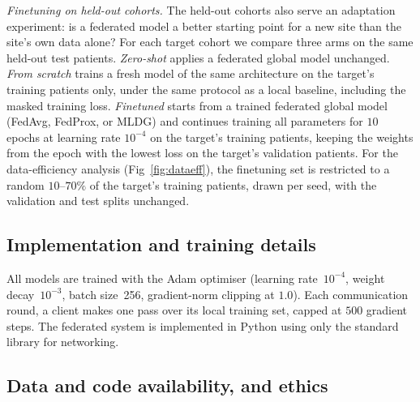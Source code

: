 \documentclass[10pt,letterpaper]{article}
\begin{document}
\emph{Finetuning on held-out cohorts.} The held-out cohorts also serve an
adaptation experiment: is a federated model a better starting point for a new
site than the site's own data alone? For each target cohort we compare three
arms on the same held-out test patients. \emph{Zero-shot} applies a federated
global model unchanged. \emph{From scratch} trains a fresh model of the same
architecture on the target's training patients only, under the same protocol
as a local baseline, including the masked training loss. \emph{Finetuned}
starts from a trained federated global
model (FedAvg, FedProx, or MLDG) and continues training all parameters for
$10$ epochs at learning rate $10^{-4}$ on the target's training patients,
keeping the weights from the epoch with the lowest loss on the target's
validation patients. For the data-efficiency analysis (Fig~\ref{fig:dataeff}),
the finetuning set is restricted to a random $10$--$70\%$ of the target's
training patients, drawn per seed, with the validation and test splits
unchanged.

\subsection*{Implementation and training details}

All models are trained with the Adam optimiser (learning rate~$10^{-4}$, weight
decay~$10^{-3}$, batch size~256, gradient-norm clipping at $1.0$). Each
communication round, a client makes one pass over its local training set,
capped at $500$ gradient steps. The
federated system is implemented in Python using only the standard library for
networking.

\subsection*{Data and code availability, and ethics}
\end{document}
